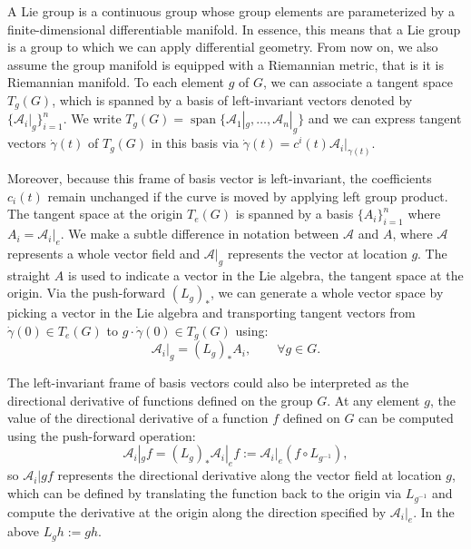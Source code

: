 \documentclass{article}
\DeclareMathOperator{\spn}{span}
\begin{document}
A Lie group is a continuous group whose group elements are parameterized by a finite-dimensional differentiable manifold. In essence, this means that a Lie group is a group to which we can apply differential geometry. From now on, we also assume the group manifold is equipped with a Riemannian metric, that is it is Riemannian manifold. To each element $g$ of $G$, we can associate a tangent space $T_g(G)$, which is spanned by a basis of left-invariant vectors denoted by $\{\mathcal{A}_i|_g\}_{i=1}^n$. We write $T_g(G) = \spn\{\mathcal{A}_1|_g, \dots, \mathcal{A}_n|_g\}$ and we can express tangent vectors $\dot{\gamma}(t)$ of $T_g(G)$ in this basis via $\dot{\gamma}(t) = c^i(t) \mathcal{A}_i|_{\gamma(t)}$.

Moreover, because this frame of basis vector is left-invariant, the coefficients $c_i(t)$ remain unchanged if the curve is moved by applying left group product. The tangent space at the origin $T_e(G)$ is spanned by a basis $\{A_i\}_{i=1}^n$ where $A_i = \mathcal{A}_i|_e$. We make a subtle difference in notation between $\mathcal{A}$ and $A$, where $\mathcal{A}$ represents a whole vector field and $\mathcal{A}|_g$ represents the vector at location $g$. The straight $A$ is used to indicate a vector in the Lie algebra, the tangent space at the origin. Via the push-forward $(L_g)_*$, we can generate a whole vector space by picking a vector in the Lie algebra and transporting tangent vectors from $\dot{\gamma}(0) \in T_e(G)$ to $g \cdot \dot{\gamma}(0) \in T_g(G)$ using:
\begin{equation}
\mathcal{A}_i|_g = (L_g)_* A_i , \qquad \forall g \in G.
\end{equation}

The left-invariant frame of basis vectors could also be interpreted as the directional derivative of functions defined on the group $G$. At any element $g$, the value of the directional derivative of a function $f$ defined on $G$ can be computed using the push-forward operation:
\begin{equation}
\mathcal{A}_i|_g f = (L_g)_* \mathcal{A}_i|_e f := \mathcal{A}_i|_e (f \circ L_{g^{-1}}),
\end{equation}
so $\mathcal{A}_i|g f$ represents the directional derivative along the vector field at location $g$, which can be defined by translating the function back to the origin via $L_{g^{-1}}$ and compute the derivative at the origin along the direction specified by $\mathcal{A}_i|_e$. In the above $L_g h:= g h$.
 
\end{document}
